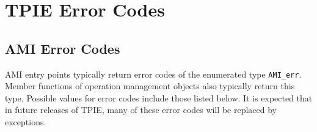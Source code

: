 
\chapter{TPIE Error Codes}

\section{AMI Error Codes}
\label{sec:ami-errors}

AMI entry points typically return error codes of the
enumerated type \verb|AMI_err|.  Member functions of operation management
objects also typically return this
type.  Possible values for error codes include those listed below.  It is
expected that in future releases of TPIE, many of these error codes will be
replaced by exceptions.  

